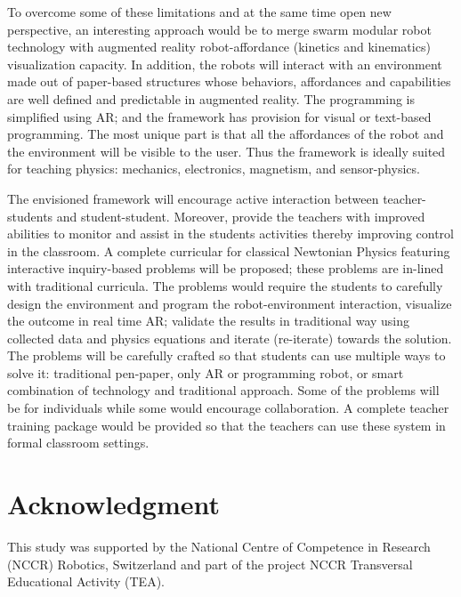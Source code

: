 \documentclass[conference]{IEEEtran}
\begin{document}
To overcome some of these limitations and at the same time open new perspective, an interesting approach would be to 
merge swarm modular robot technology with augmented reality robot-affordance (kinetics and kinematics) visualization 
capacity. In addition, the robots will interact with an environment made out of paper-based structures whose behaviors, 
affordances and capabilities are well defined and predictable in augmented reality. The programming is simplified using 
AR; and the framework has provision for visual or text-based programming. The most unique part is that all the 
affordances of the robot and the environment will be visible to the user. Thus the framework is ideally suited for 
teaching physics: mechanics, electronics, magnetism, and sensor-physics. 

The envisioned framework will encourage active interaction between teacher-students and student-student. Moreover, 
provide the teachers with improved abilities to monitor and assist in the students activities thereby improving control 
in the classroom. A complete curricular for classical Newtonian Physics featuring interactive inquiry-based problems 
will be proposed; these problems are in-lined with traditional curricula. The problems would require the students to 
carefully design the environment and program the robot-environment interaction, visualize the outcome in real time 
AR; validate the results in traditional way using collected data and physics equations and iterate 
(re-iterate) towards the solution. The problems will be carefully crafted so that students can use multiple ways to 
solve it: traditional pen-paper, only AR or programming robot, or smart combination of technology and traditional 
approach. Some of the problems will be for individuals while some would encourage collaboration. A complete 
teacher training package would be provided so that the teachers can use these system in formal classroom settings.
\section*{Acknowledgment}
This study was supported by the National Centre of Competence in Research (NCCR) Robotics, Switzerland and part of the 
project NCCR Transversal Educational Activity (TEA).


\end{document}
